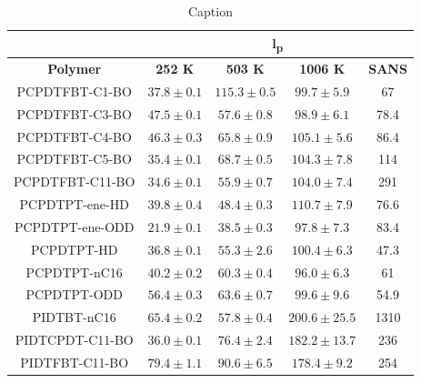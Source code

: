\begin{table}[ht]
    \centering
    \begin{tabular}{c|c|c|c|c}
                        &  \multicolumn{4}{c}{\textbf{l\textsubscript{p}}}  \\
        \hline
        \textbf{Polymer}  & \textbf{252 K} & \textbf{503 K} & \textbf{1006 K} & \textbf{SANS}\\
        \hline
        PCPDTFBT-C1-BO    &   $37.8 \pm 0.1$    &	$115.3 \pm 0.5$   &   $99.7 \pm 5.9$     &    67	 \\
        PCPDTFBT-C3-BO    &   $47.5 \pm 0.1$    &	$57.6 \pm 0.8$    &   $98.9 \pm 6.1$     &    78.4   \\
        PCPDTFBT-C4-BO    &   $46.3 \pm 0.3$    &	$65.8 \pm 0.9$    &   $105.1 \pm 5.6$    &    86.4   \\
        PCPDTFBT-C5-BO    &   $35.4 \pm 0.1$    &	$68.7\pm 0.5$     &   $104.3 \pm 7.8$    &    114	 \\
        PCPDTFBT-C11-BO   &   $34.6 \pm 0.1$    &	$55.9 \pm 0.7$    &   $104.0 \pm 7.4$    &    291	 \\
        PCPDTPT-ene-HD    &   $39.8 \pm 0.4$    &	$48.4 \pm 0.3$    &   $110.7 \pm 7.9$    &    76.6   \\
        PCPDTPT-ene-ODD   &   $21.9 \pm 0.1$    &	$38.5 \pm 0.3$    &   $97.8 \pm 7.3$     &    83.4   \\
        PCPDTPT-HD        &   $36.8 \pm 0.1$    &	$55.3 \pm 2.6$    &   $100.4 \pm 6.3$    &    47.3   \\
        PCPDTPT-nC16      &   $40.2 \pm 0.2$    &	$60.3 \pm 0.4$    &   $96.0 \pm 6.3$     &    61     \\
        PCPDTPT-ODD       &   $56.4 \pm 0.3$    &	$63.6 \pm 0.7$    &   $99.6 \pm 9.6$     &    54.9   \\
        PIDTBT-nC16       &   $65.4\pm 0.2$     &	$57.8 \pm 0.4$    &   $200.6 \pm 25.5$   &    1310   \\
        PIDTCPDT-C11-BO   &   $36.0 \pm 0.1$    &	$76.4 \pm 2.4$    &   $182.2 \pm 13.7$   &    236	 \\
        PIDTFBT-C11-BO    &   $79.4 \pm 1.1$    &	$90.6 \pm 6.5$    &   $178.4 \pm 9.2$    &    254	 \\
    \end{tabular}
    \caption{Caption}
    \label{tab:l_p}
\end{table}

